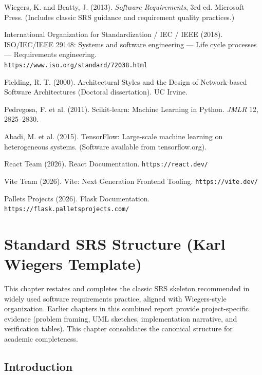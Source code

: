 \documentclass[12pt,oneside,openany]{report}
\begin{document}
\begin{enumerate}[label={[\arabic*]},leftmargin=1.4cm]
\item Wiegers, K. and Beatty, J. (2013). \emph{Software Requirements}, 3rd ed. Microsoft Press. (Includes classic SRS guidance and requirement quality practices.)
\item International Organization for Standardization / IEC / IEEE (2018). ISO/IEC/IEEE 29148: Systems and software engineering --- Life cycle processes --- Requirements engineering.\\
\texttt{https://www.iso.org/standard/72038.html}
\item Fielding, R. T. (2000). Architectural Styles and the Design of Network-based Software Architectures (Doctoral dissertation). UC Irvine.
\item Pedregosa, F. et al. (2011). Scikit-learn: Machine Learning in Python. \emph{JMLR} 12, 2825--2830.
\item Abadi, M. et al. (2015). TensorFlow: Large-scale machine learning on heterogeneous systems. (Software available from tensorflow.org).
\item React Team (2026). React Documentation. \texttt{https://react.dev/}
\item Vite Team (2026). Vite: Next Generation Frontend Tooling. \texttt{https://vite.dev/}
\item Pallets Projects (2026). Flask Documentation. \texttt{https://flask.palletsprojects.com/}
\end{enumerate}

\chapter{Standard SRS Structure (Karl Wiegers Template)}

\noindent This chapter restates and completes the classic SRS skeleton recommended in widely used software requirements practice, aligned with Wiegers-style organization. Earlier chapters in this combined report provide project-specific evidence (problem framing, UML sketches, implementation narrative, and verification tables). This chapter consolidates the canonical structure for academic completeness.

\section{Introduction}
\end{document}
